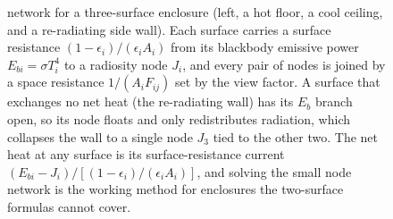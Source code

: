 \begin{figure}[htbp]
{network for a three-surface enclosure (left, a hot floor, a cool ceiling,
and a re-radiating side wall). Each surface carries a surface resistance
$(1-\epsilon_i)/(\epsilon_i A_i)$ from its blackbody emissive power
$E_{bi}=\sigma T_i^4$ to a radiosity node $J_i$, and every pair of nodes is
joined by a space resistance $1/(A_i F_{ij})$ set by the view factor. A
surface that exchanges no net heat (the re-radiating wall) has its
$E_{b}$ branch open, so its node floats and only redistributes radiation,
which collapses the wall to a single node $J_3$ tied to the other two. The
net heat at any surface is its surface-resistance current
$(E_{bi}-J_i)/[(1-\epsilon_i)/(\epsilon_i A_i)]$, and solving the small
node network is the working method for enclosures the two-surface formulas
cannot cover.}
\label{fig:vol04ch05:enclosure-network}
\end{figure}
